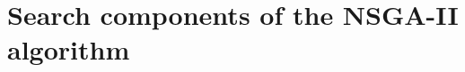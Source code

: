 \section[Search components of the NSGA-II algorithm]{\label{identificadorReferenciaCruzada}
Search components of the NSGA-II algorithm}

